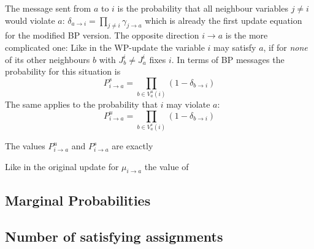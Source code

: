 The message sent from $a$ to $i$ is the probability that all neighbour variables $j \neq i$ would violate $a$: $\delta_{a \rightarrow i} = \prod_{j \neq i} \gamma_{j \rightarrow a}$ which is already the first update equation for the modified BP version.
The opposite direction $i \rightarrow a$ is the more complicated one: 
Like in the WP-update the variable $i$ may satisfy $a$, if for \emph{none} of its other neighbours $b$ with $J_b^i \neq J_a^i$ fixes $i$. In terms of BP messages the probability for this situation is $$P_{i \rightarrow a}^s = \prod_{b \in V_a^u(i)}(1 - \delta_{b \rightarrow i})$$
The same applies to the probability that $i$ may violate $a$: 
 $$P_{i \rightarrow a}^u = \prod_{b \in V_a^s(i)}(1 - \delta_{b \rightarrow i})$$

The values $P_{i \rightarrow a}^u$ and $P_{i \rightarrow a}^s$ are exactly 

Like in the original update for $\mu_{i \rightarrow a}$ the value of \
\subsection{Marginal Probabilities}

\subsection{Number of satisfying assignments}